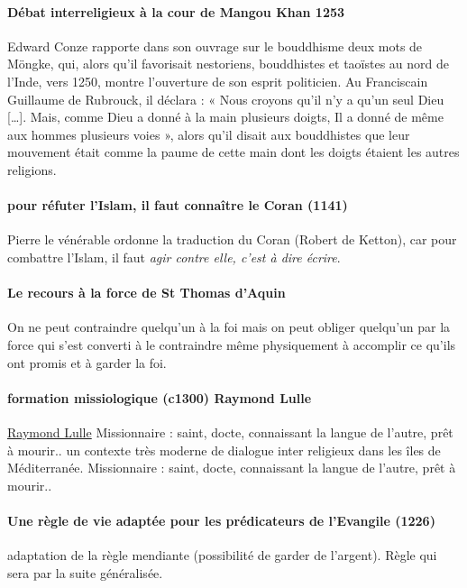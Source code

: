 \paragraph{Débat interreligieux à la cour de Mangou Khan 1253}  Edward Conze rapporte dans son ouvrage sur le bouddhisme deux mots de Möngke, qui, alors qu'il favorisait nestoriens, bouddhistes et taoïstes au nord de l'Inde, vers 1250, montre l'ouverture de son esprit politicien. Au Franciscain Guillaume de Rubrouck, il déclara : « Nous croyons qu'il n'y a qu'un seul Dieu […]. Mais, comme Dieu a donné à la main plusieurs doigts, Il a donné de même aux hommes plusieurs voies », alors qu'il disait aux bouddhistes que leur mouvement était comme la paume de cette main dont les doigts étaient les autres religions.

\paragraph{pour réfuter l'Islam, il faut connaître le Coran (1141)} Pierre le vénérable ordonne la traduction du Coran (Robert de Ketton), car pour combattre l'Islam, il faut \textit{agir contre elle, c'est à dire écrire}. 


\paragraph{Le recours à la force de St Thomas d'Aquin} On ne peut contraindre quelqu'un à la foi mais on peut obliger quelqu'un par la force qui s'est converti à le contraindre même physiquement à accomplir ce qu'ils ont promis et à garder la foi. 



\paragraph{formation missiologique (c1300) Raymond Lulle} \href{https://fr.wikipedia.org/wiki/Raymond_Lulle}{Raymond Lulle} Missionnaire : saint, docte, connaissant la langue de l'autre, prêt à mourir.. 
 un contexte très moderne de dialogue inter religieux dans les îles de Méditerranée.  Missionnaire : saint, docte, connaissant la langue de l'autre, prêt à mourir.. 


\paragraph{Une règle de vie adaptée pour les prédicateurs de l'Evangile (1226)} adaptation de la règle mendiante (possibilité de garder de l'argent). Règle qui sera par la suite généralisée.


